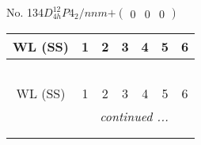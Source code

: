 \documentclass[fleqn,9pt,landscape]{jsarticle}
\begin{document}
\newpage
No. 134\quad$D_{4h}^{12}$\quad$P4_2/nnm$\quad[ tetragonal ]\quad$+\begin{pmatrix} 0 & 0 & 0 \end{pmatrix}$
\begin{center}
\renewcommand{\arraystretch}{1.2}
\begin{longtable}{ccccccc}
 \hline \hline
WL (SS) & 1 & 2 & 3 & 4 & 5 & 6 \\ \hline \endfirsthead

\multicolumn{6}{l}{\tablename\ \thetable{}} \\
 \hline \hline
WL (SS) & 1 & 2 & 3 & 4 & 5 & 6 \\ \hline \endhead

 \hline \hline
\multicolumn{6}{r}{\footnotesize\it continued ...} \\ \endfoot

 \hline \hline
\multicolumn{6}{r}{} \\ \endlastfoot


\end{longtable}
\end{center}
\end{document}
